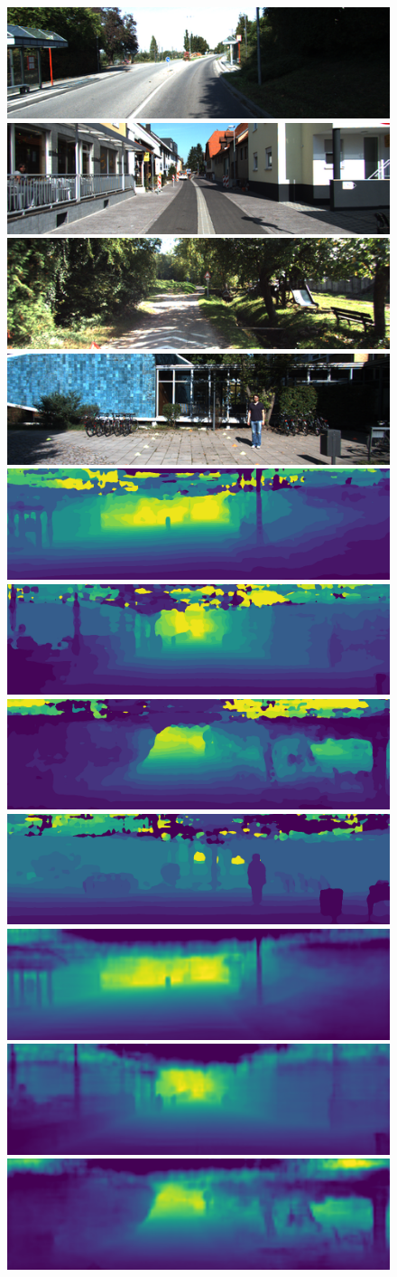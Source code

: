 \documentclass[lang=english]{tumarxivarticle}
\begin{document}
\begin{figure}
  \includegraphics[width=.24\linewidth]{figures/result_images/7_rgb} \hfill
  \includegraphics[width=.24\linewidth]{figures/result_images/10_rgb} \hfill
  \includegraphics[width=.24\linewidth]{figures/result_images/9_rgb} \hfill
  \includegraphics[width=.24\linewidth]{figures/result_images/14_rgb} \\[1mm]
  \includegraphics[width=.24\linewidth]{figures/result_images/7_cls} \hfill
  \includegraphics[width=.24\linewidth]{figures/result_images/10_cls} \hfill
  \includegraphics[width=.24\linewidth]{figures/result_images/9_cls} \hfill
  \includegraphics[width=.24\linewidth]{figures/result_images/14_cls} \\[1mm]
  \includegraphics[width=.24\linewidth]{figures/result_images/7_reg} \hfill
  \includegraphics[width=.24\linewidth]{figures/result_images/10_reg} \hfill
  \includegraphics[width=.24\linewidth]{figures/result_images/9_reg} \hfill

\end{figure}
\end{document}
